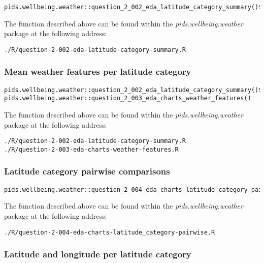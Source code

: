 \documentclass[12pt, oneside, openany]{book}
\begin{document}
\begin{verbatim}
pids.wellbeing.weather::question_2_002_eda_latitude_category_summary()$weather_stations
\end{verbatim}

The function described above can be found within the \emph{pids.wellbeing.weather} package at the following address:

\begin{verbatim}
./R/question-2-002-eda-latitude-category-summary.R
\end{verbatim}

\subsubsection*{Mean weather features per latitude category}

\begin{verbatim}
pids.wellbeing.weather::question_2_002_eda_latitude_category_summary()$means
pids.wellbeing.weather::question_2_003_eda_charts_weather_features()
\end{verbatim}

The function described above can be found within the \emph{pids.wellbeing.weather} package at the following address:

\begin{verbatim}
./R/question-2-002-eda-latitude-category-summary.R
./R/question-2-003-eda-charts-weather-features.R
\end{verbatim}

\subsubsection*{Latitude category pairwise comparisons}

\begin{verbatim}
pids.wellbeing.weather::question_2_004_eda_charts_latitude_category_pairwise()
\end{verbatim}

The function described above can be found within the \emph{pids.wellbeing.weather} package at the following address:

\begin{verbatim}
./R/question-2-004-eda-charts-latitude_category-pairwise.R
\end{verbatim}

\subsubsection*{Latitude and longitude per latitude category}
\end{document}
